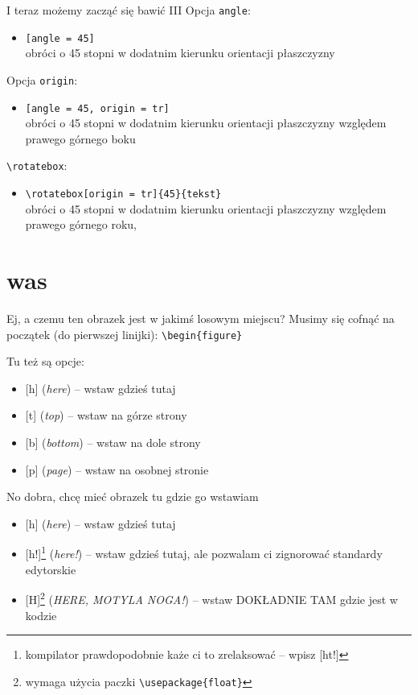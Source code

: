 \documentclass{beamer}
\newcommand{\tb}{\textbackslash}
\begin{document}
\begin{frame}{I teraz możemy zacząć się bawić III}{}
    Opcja \texttt{angle}:
    \begin{itemize}
        \item \texttt{[angle = 45]}\\
        obróci o 45 stopni w dodatnim kierunku orientacji płaszczyzny
    \end{itemize}\pause
    Opcja \texttt{origin}:
    \begin{itemize}
        \item \texttt{[angle = 45, origin = tr]}\\
        obróci o 45 stopni w dodatnim kierunku orientacji płaszczyzny względem prawego górnego boku
    \end{itemize}\pause
    \texttt{\tb{rotatebox}}:
    \begin{itemize}
        \item \texttt{\tb{}rotatebox[origin = tr]\{45\}\{tekst\}}\\
        obróci o 45 stopni w dodatnim kierunku orientacji płaszczyzny względem prawego górnego roku, 
    \end{itemize}
    
\end{frame}

\section{was}

\begin{frame}{Ej, a czemu ten obrazek jest w jakimś losowym miejscu?}{}
    Musimy się cofnąć na początek (do pierwszej linijki):
    \texttt{\tb{begin\{figure\}}}
    
    Tu też są opcje:
    \begin{itemize}
        \item{} [h] (\emph{here}) -- wstaw gdzieś tutaj
        \item{} [t] (\emph{top}) -- wstaw na górze strony
        \item{} [b] (\emph{bottom}) -- wstaw na dole strony
        \item{} [p] (\emph{page}) -- wstaw na osobnej stronie
    \end{itemize}
\end{frame}

\begin{frame}{No dobra, chcę mieć obrazek tu gdzie go wstawiam}
    \begin{itemize}
        \item{} [h] (\emph{here}) -- wstaw gdzieś tutaj
        \item{} [h!]\footnote{kompilator prawdopodobnie każe ci to zrelaksować -- wpisz [ht!]} (\emph{here!}) -- wstaw gdzieś tutaj, ale pozwalam ci zignorować standardy edytorskie
        \item{} [H]\footnote{wymaga użycia paczki \texttt{\tb{usepackage\{float\}}}} (\emph{HERE, MOTYLA NOGA!}) -- wstaw DOKŁADNIE TAM gdzie jest w kodzie
    \end{itemize}
\end{frame}
\end{document}
